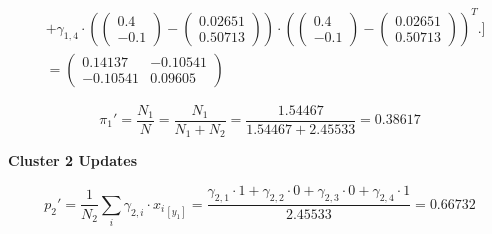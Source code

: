 \documentclass[12pt]{article}
\begin{document}
\begin{enumerate}[leftmargin=\labelsep]
\begin{align*}
                        & + \gamma_{1,4} \cdot \left(\begin{pmatrix} 0.4 \\ -0.1 \end{pmatrix} - \begin{pmatrix} 0.02651 \\ 0.50713 \end{pmatrix}\right) \cdot \left(\begin{pmatrix} 0.4 \\ -0.1 \end{pmatrix} - \begin{pmatrix} 0.02651 \\ 0.50713 \end{pmatrix}\right)^T
                        \Bigg. \Bigg] \\
                        & = \begin{pmatrix} 0.14137 & -0.10541 \\ -0.10541 & 0.09605 \end{pmatrix}
          \end{align*}
          \endgroup

          \begin{equation*}
              \pi_1' = \frac{N_1}{N} = \frac{N_1}{N_1 + N_2} = \frac{1.54467}{1.54467 + 2.45533} = 0.38617
          \end{equation*}

          \begin{center}
              \textbf{\colorbox{byellow}{Cluster 2 Updates}}
          \end{center}

          \begingroup
          \allowdisplaybreaks
          \begin{equation*}
              p_2' = \frac{1}{N_2} \sum_{i} \gamma_{2,i} \cdot {x_i}_{[y_1]}
                   = \frac{\gamma_{2,1} \cdot 1
                          + \gamma_{2,2} \cdot 0
                          + \gamma_{2,3} \cdot 0
                          + \gamma_{2,4} \cdot 1}{2.45533}
                   = 0.66732
          \end{equation*}
          \endgroup


\end{enumerate}
\end{document}
